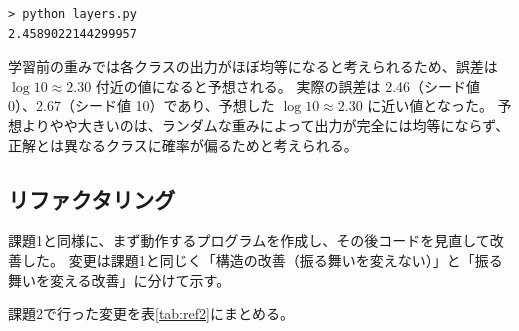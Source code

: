 \documentclass[a4paper,11pt]{ltjsarticle}
\begin{document}
\begin{lstlisting}[language={}, numbers=none, caption={課題2の実行例}, label=lst:run2]
> python layers.py
2.4589022144299957
\end{lstlisting}

学習前の重みでは各クラスの出力がほぼ均等になると考えられるため、誤差は $\log 10 \approx 2.30$ 付近の値になると予想される。
実際の誤差は 2.46（シード値 0）、2.67（シード値 10）であり、予想した $\log 10 \approx 2.30$ に近い値となった。
予想よりやや大きいのは、ランダムな重みによって出力が完全には均等にならず、正解とは異なるクラスに確率が偏るためと考えられる。

\subsection{リファクタリング}
\label{sec:ref2}
課題1と同様に、まず動作するプログラムを作成し、その後コードを見直して改善した。
変更は課題1と同じく「構造の改善（振る舞いを変えない）」と「振る舞いを変える改善」に分けて示す。


課題2で行った変更を表\ref{tab:ref2}にまとめる。
\end{document}
